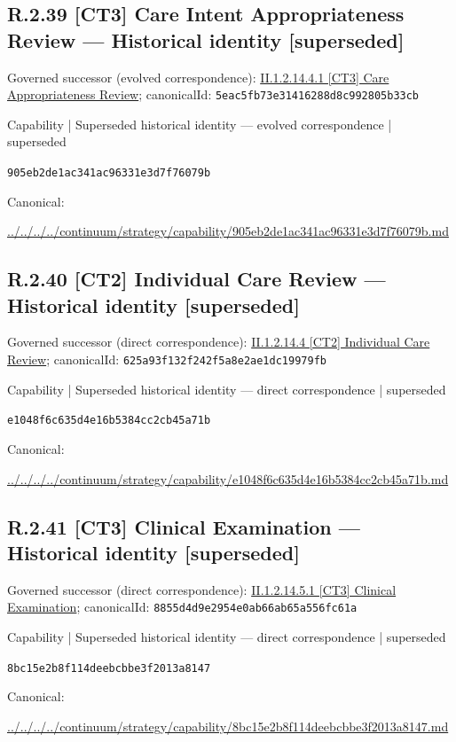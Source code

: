 \documentclass[10pt,a4paper]{article}
\begin{document}
\subsection*{R.2.39 [CT3] Care Intent Appropriateness Review — Historical identity [superseded]}
Governed successor (evolved correspondence): \hyperref[element-5eac5fb73e31416288d8c992805b33cb]{II.1.2.14.4.1 [CT3] Care Appropriateness Review}; canonicalId: \texttt{5eac5fb73e31416288d8c992805b33cb}\par
\label{element-905eb2de1ac341ac96331e3d7f76079b}
{\small Capability | Superseded historical identity — evolved correspondence | superseded}\par
\texttt{905eb2de1ac341ac96331e3d7f76079b}\par
Canonical: \par
{\footnotesize\url{../../../../continuum/strategy/capability/905eb2de1ac341ac96331e3d7f76079b.md}}\par
\subsection*{R.2.40 [CT2] Individual Care Review — Historical identity [superseded]}
Governed successor (direct correspondence): \hyperref[element-625a93f132f242f5a8e2ae1dc19979fb]{II.1.2.14.4 [CT2] Individual Care Review}; canonicalId: \texttt{625a93f132f242f5a8e2ae1dc19979fb}\par
\label{element-e1048f6c635d4e16b5384cc2cb45a71b}
{\small Capability | Superseded historical identity — direct correspondence | superseded}\par
\texttt{e1048f6c635d4e16b5384cc2cb45a71b}\par
Canonical: \par
{\footnotesize\url{../../../../continuum/strategy/capability/e1048f6c635d4e16b5384cc2cb45a71b.md}}\par
\subsection*{R.2.41 [CT3] Clinical Examination — Historical identity [superseded]}
Governed successor (direct correspondence): \hyperref[element-8855d4d9e2954e0ab66ab65a556fc61a]{II.1.2.14.5.1 [CT3] Clinical Examination}; canonicalId: \texttt{8855d4d9e2954e0ab66ab65a556fc61a}\par
\label{element-8bc15e2b8f114deebcbbe3f2013a8147}
{\small Capability | Superseded historical identity — direct correspondence | superseded}\par
\texttt{8bc15e2b8f114deebcbbe3f2013a8147}\par
Canonical: \par
{\footnotesize\url{../../../../continuum/strategy/capability/8bc15e2b8f114deebcbbe3f2013a8147.md}}\par
\end{document}
